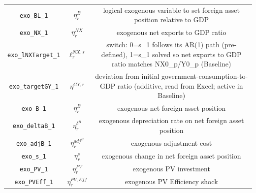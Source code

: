 \begin{center}
\begin{longtable}{ccc}
\texttt{exo\_BL\_1} & ${\eta^{B}_r}$ & logical exogenous variable to set foreign asset position relative to GDP\\
\texttt{exo\_NX\_1} & ${\eta^{NX}_r}$ & exogenous net exports to GDP ratio\\
\texttt{exo\_lNXTarget\_1} & ${\ell^{NX,s}_r}$ & switch: 0=s\_1 follows its AR(1) path (pre-defined), 1=s\_1 solved so net exports to GDP ratio matches NX0\_p/Y0\_p (Baseline)\\
\texttt{exo\_targetGY\_1} & ${\eta^{GY,r}}$ & deviation from initial government-consumption-to-GDP ratio (additive, read from Excel; active in Baseline)\\
\texttt{exo\_B\_1} & ${\eta^{B}_r}$ & exogenous net foreign asset position\\
\texttt{exo\_deltaB\_1} & ${\eta^{\delta^B}_r}$ & exogenous depreciation rate on net foreign asset position\\
\texttt{exo\_adjB\_1} & ${\eta^{adj^B}_r}$ & exogenous adjustment cost\\
\texttt{exo\_s\_1} & ${\eta^{s}_r}$ & exogenous change in net foreign asset position\\
\texttt{exo\_PV\_1} & ${\eta^{PV}_r}$ & exogenous PV investment\\
\texttt{exo\_PVEff\_1} & ${\eta^{PV,Eff}_r}$ & exogenous PV Efficiency shock\\
\hline%
\end{longtable}
\end{center}
